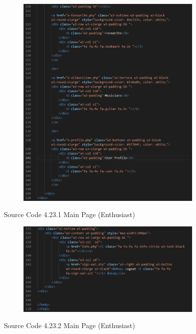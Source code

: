 \begin{enumerate}[1.]
\begin{figure}[h]
\begin{subfigure}[b]{0.6\textwidth}
            \includegraphics[width=\textwidth]{mainmatter/images/frontend/code/emain2.png}
            \label{fig:sub2}
        \end{subfigure}
        \caption*{Source Code 4.23.1 Main Page (Enthusiast)}
        \label{fig:myfig62a}
    \end{figure}
    \clearpage
    \begin{figure}[h]\ContinuedFloat
        \centering
        \begin{subfigure}[b]{0.6\textwidth}
            \centering
            \includegraphics[width=\textwidth]{mainmatter/images/frontend/code/emain3.png}
            \label{fig:sub3}
        \end{subfigure}
        \caption*{Source Code 4.23.2 Main Page (Enthusiast)}
        \label{fig:myfig62b}
    \end{figure}
    

\end{enumerate}
